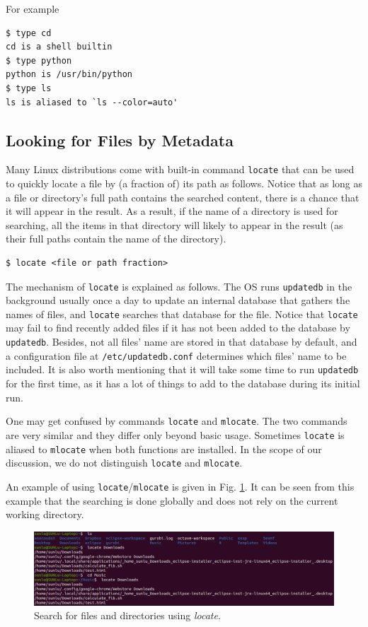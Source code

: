 For example
\begin{lstlisting}
$ type cd
cd is a shell builtin
$ type python
python is /usr/bin/python
$ type ls
ls is aliased to `ls --color=auto'
\end{lstlisting}

\subsection{Looking for Files by Metadata}

Many Linux distributions come with built-in command \verb|locate| that can be used to quickly locate a file by (a fraction of) its path as follows. Notice that as long as a file or directory's full path contains the searched content, there is a chance that it will appear in the result. As a result, if the name of a directory is used for searching, all the items in that directory will likely to appear in the result (as their full paths contain the name of the directory).
\begin{lstlisting}
$ locate <file or path fraction>
\end{lstlisting}

The mechanism of \verb|locate| is explained as follows. The OS runs \verb|updatedb| in the background usually once a day to update an internal database that gathers the names of files, and \verb|locate| searches that database for the file. Notice that \verb|locate| may fail to find recently added files if it has not been added to the database by \verb|updatedb|. Besides, not all files' name are stored in that database by default, and a configuration file at \verb|/etc/updatedb.conf| determines which files' name to be included. It is also worth mentioning that it will take some time to run \verb|updatedb| for the first time, as it has a lot of things to add to the database during its initial run.

One may get confused by commands \verb|locate| and \verb|mlocate|. The two commands are very similar and they differ only beyond basic usage. Sometimes \verb|locate| is aliased to \verb|mlocate| when both functions are installed. In the scope of our discussion, we do not distinguish \verb|locate| and \verb|mlocate|.

An example of using \verb|locate|/\verb|mlocate| is given in Fig. \ref{ch:fm:fig:locateexp}. It can be seen from this example that the searching is done globally and does not rely on the current working directory.
\begin{figure}[htbp]
	\centering
	\includegraphics[width=\textwidth]{chapters/part-1/figures/locateexp.png}
	\caption{Search for files and directories using \textit{locate}.} \label{ch:fm:fig:locateexp}
\end{figure}

